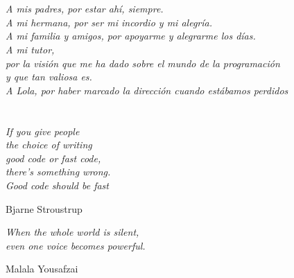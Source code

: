 \chapter*{}
\setlength{\leftmargin}{0.5\textwidth}
\setlength{\parsep}{0cm}
\addtolength{\topsep}{0.5cm}
\begin{flushright}
\small\em{
A mis padres, por estar ahí, siempre.\\
A mi hermana, por ser mi incordio y mi alegría.\\
A mi familia y amigos, por apoyarme y alegrarme los días.\\
\bigskip
A mi tutor,\\
por la visión que me ha dado sobre el mundo de la programación\\
y que tan valiosa es.\\
\bigskip
A Lola, por haber marcado la dirección cuando estábamos perdidos
}
\end{flushright}


\cleardoublepage %
\chapter*{}
\setlength{\leftmargin}{0.5\textwidth}
\setlength{\parsep}{0cm}
\addtolength{\topsep}{0.5cm}
\begin{flushright}
\small\em{
If you give people\\
the choice of writing\\
good code or fast code,\\
there's something wrong.\\
Good code should be fast\\
}
\end{flushright}
\begin{flushright}
\small{
Bjarne Stroustrup
}
\end{flushright}
\setlength{\leftmargin}{0.5\textwidth}
\setlength{\parsep}{0cm}
\addtolength{\topsep}{0.5cm}
\begin{flushright}
\small\em{
When the whole world is silent,\\
even one voice becomes powerful.
}
\end{flushright}
\begin{flushright}
\small{
Malala Yousafzai
}
\end{flushright}
\cleardoublepage %
